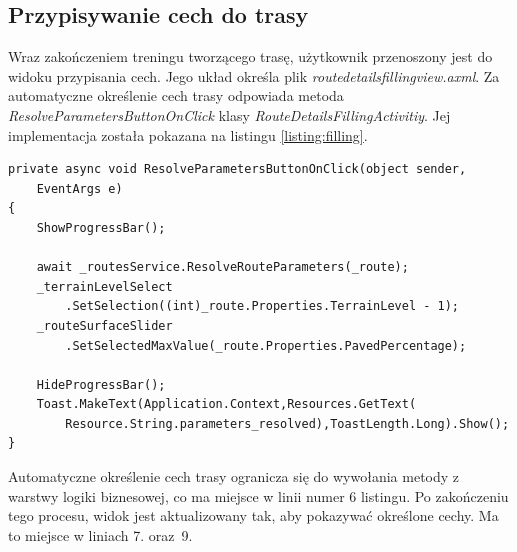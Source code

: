 \subsection{Przypisywanie cech do trasy}
Wraz zakończeniem treningu tworzącego trasę, użytkownik przenoszony jest do widoku przypisania cech. Jego układ określa plik \textit{route\textunderscore details\textunderscore filling\textunderscore view.axml}. Za automatyczne określenie cech trasy odpowiada metoda \textit{ResolveParametersButtonOnClick} klasy \textit{RouteDetailsFillingActivitiy}. Jej implementacja została pokazana na listingu \ref{listing:filling}.\\
\begin{lstlisting}[caption={Wywołanie procesu automatycznego przypisania cech trasy},label=listing:filling]
private async void ResolveParametersButtonOnClick(object sender,
	EventArgs e)
{
    ShowProgressBar();

    await _routesService.ResolveRouteParameters(_route);
    _terrainLevelSelect
    	.SetSelection((int)_route.Properties.TerrainLevel - 1);
    _routeSurfaceSlider
    	.SetSelectedMaxValue(_route.Properties.PavedPercentage);

    HideProgressBar();
    Toast.MakeText(Application.Context,Resources.GetText(
    	Resource.String.parameters_resolved),ToastLength.Long).Show();
}
\end{lstlisting}
Automatyczne określenie cech trasy ogranicza się do wywołania metody z warstwy logiki biznesowej, co ma miejsce w linii numer 6 listingu. Po zakończeniu tego procesu, widok jest aktualizowany tak, aby pokazywać określone cechy. Ma to miejsce w liniach 7. oraz~9.
